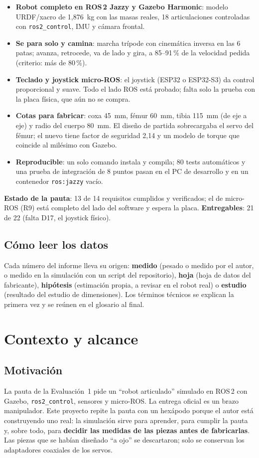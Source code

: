 \documentclass[11pt,a4paper]{article}
\newcommand{\seccion}[1]{\Needspace{18\baselineskip}\section{#1}}
\newcommand{\subsec}[1]{\Needspace{9\baselineskip}\subsection{#1}}
\begin{document}
\begin{destacado}[title=Resultados principales]
\begin{itemize}[leftmargin=12pt]
  \item \textbf{Robot completo en ROS\,2 Jazzy y Gazebo Harmonic}: modelo
  URDF/xacro de 1,876~kg con las masas reales, 18 articulaciones controladas
  con \texttt{ros2\_control}, IMU y cámara frontal.
  \item \textbf{Se para solo y camina}: marcha trípode con cinemática inversa
  en las 6 patas; avanza, retrocede, va de lado y gira, a 85--91\,\% de la
  velocidad pedida (criterio: más de 80\,\%).
  \item \textbf{Teclado y joystick micro-ROS}: el joystick (ESP32 o ESP32-S3)
  da control proporcional y suave. Todo el lado ROS está probado; falta solo
  la prueba con la placa física, que aún no se compra.
  \item \textbf{Cotas para fabricar}: coxa 45~mm, fémur 60~mm, tibia 115~mm
  (de eje a eje) y radio del cuerpo 80~mm. El diseño de partida sobrecargaba
  el servo del fémur; el nuevo tiene factor de seguridad 2,14 y un modelo de
  torque que coincide al milésimo con Gazebo.
  \item \textbf{Reproducible}: un solo comando instala y compila; 80 tests
  automáticos y una prueba de integración de 8 puntos pasan en el PC de
  desarrollo y en un contenedor \texttt{ros:jazzy} vacío.
\end{itemize}
\end{destacado}

\textbf{Estado de la pauta}: 13 de 14 requisitos cumplidos y verificados; el
de micro-ROS (R9) está completo del lado del software y espera la placa.
\textbf{Entregables}: 21 de 22 (falta D17, el joystick físico).

\subsec{Cómo leer los datos}

Cada número del informe lleva su origen: \textbf{medido} (pesado o medido por
el autor, o medido en la simulación con un script del repositorio),
\textbf{hoja} (hoja de datos del fabricante), \textbf{hipótesis} (estimación
propia, a revisar en el robot real) o \textbf{estudio} (resultado del estudio
de dimensiones). Los términos técnicos se explican la primera vez y se
reúnen en el glosario al final.

\seccion{Contexto y alcance}

\subsec{Motivación}

La pauta de la Evaluación~1 pide un ``robot articulado'' simulado en ROS\,2
con Gazebo, \texttt{ros2\_control}, sensores y micro-ROS. La entrega oficial
es un brazo manipulador. Este proyecto repite la pauta con un hexápodo
porque el autor está construyendo uno real: la simulación sirve para
aprender, para cumplir la pauta y, sobre todo, para \textbf{decidir las
medidas de las piezas antes de fabricarlas}. Las piezas que se habían
diseñado ``a ojo'' se descartaron; solo se conservan los adaptadores
coaxiales de los servos.
\end{document}
